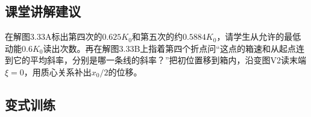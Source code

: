 \documentclass[UTF8,fontset=fandol,a4paper,11pt]{ctexart}
\begin{document}


\subsection*{课堂讲解建议}

在解图3.33A标出第四次的$0.625K_0$和第五次的约$0.5884K_0$，请学生从允许的最低动能$0.6K_0$读出次数。再在解图3.33B上指着第四个折点问“这点的箱速和从起点连到它的平均斜率，分别是哪一条线的斜率？”把初位置移到箱内，沿变图V2读末端$\xi=0$，用质心关系补出$x_0/2$的位移。



\subsection*{变式训练}
\end{document}
